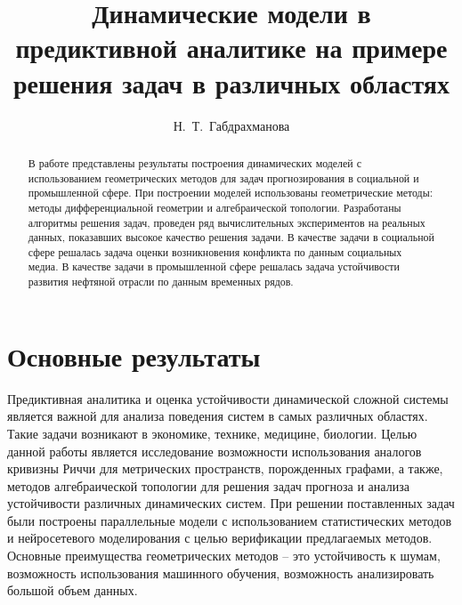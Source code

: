 \usepackage{todonotes}

\usepackage[russian]{nla}


\fi

\title{Динамические модели в предиктивной аналитике на примере решения задач в различных областях}
\author{Н.~Т.~Габдрахманова
}

\institute{РУДН им. Патриса Лумумбы, Москва, РФ \\
 \email{gabdrakhmanova-nt@rudn.ru}
}

\maketitle

\begin{abstract}
В работе представлены результаты построения динамических моделей с использованием геометрических методов для задач прогнозирования в социальной и промышленной сфере. При построении моделей использованы геометрические методы: методы дифференциальной геометрии и алгебраической топологии. Разработаны алгоритмы решения задач, проведен ряд вычислительных экспериментов на реальных данных, показавших высокое качество решения задачи. В качестве задачи в социальной сфере решалась задача оценки возникновения конфликта по данным социальных медиа. В качестве задачи в промышленной сфере решалась задача устойчивости развития нефтяной отрасли по данным временных рядов.

\end{abstract}

\section{Основные результаты} %

Предиктивная аналитика и оценка устойчивости динамической сложной системы является важной для анализа поведения систем в самых различных областях. Такие задачи возникают в экономике, технике, медицине, биологии. Целью данной работы является исследование возможности использования аналогов кривизны Риччи для метрических пространств, порожденных графами, а также, методов алгебраической топологии для решения задач прогноза и анализа устойчивости различных динамических систем. При решении поставленных задач были построены параллельные модели с использованием статистических методов и нейросетевого моделирования с целью верификации предлагаемых методов. Основные преимущества геометрических методов 
-- это устойчивость к шумам, возможность использования машинного обучения, возможность анализировать большой объем данных.

